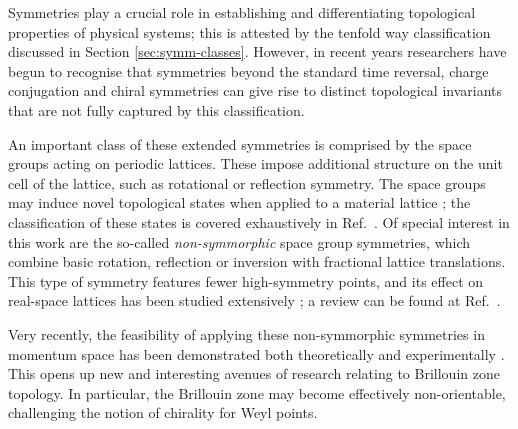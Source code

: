 \label{chap:non-orientable}

Symmetries play a crucial role in establishing and differentiating topological properties of physical systems; this is attested by the tenfold way classification discussed in Section \ref{sec:symm-classes}. However, in recent years researchers have begun to recognise that symmetries beyond the standard time reversal, charge conjugation and chiral symmetries can give rise to distinct topological invariants that are not fully captured by this classification.

An important class of these extended symmetries is comprised by the space groups acting on periodic lattices. These impose additional structure on the unit cell of the lattice, such as rotational or reflection symmetry. The space groups may induce novel topological states when applied to a material lattice \cite{Po_space-groups}; the classification of these states is covered exhaustively in Ref.~\cite{Shiozaki_AHSS}. Of special interest in this work are the so-called \emph{non-symmorphic} space group symmetries, which combine basic rotation, reflection or inversion with fractional lattice translations. This type of symmetry features fewer high-symmetry points, and its effect on real-space lattices has been studied extensively \cite{Wang_hourglass,Chen_nonsymmorphic-semimetal,Kim_glide-semimetal,Shiozaki_nonsymmorphic-topology,Bzdusek_nodal-chain,Wieder_layer-semimetal,Zhao_nonsymmorphic-semimetal,Yang_nonsymmorphic-semimetal,Wang_hourglass-semimetal,Wang_hourglass-Dirac,Wieder_wallpaper-fermions,Xiao_hourglass-Weyl}; a review can be found at Ref.~\cite{Zhang_nonsymmorphic-review}.

Very recently, the feasibility of applying these non-symmorphic symmetries in momentum space has been demonstrated both theoretically and experimentally \cite{CYZ_Klein-gauge,Zhang_nonsymmorphic,TaoYan_acoustic-Klein,Zhu_acoustic-Klein-halfturn,HZY_RP2,WangZhang_acoustic-Klein-2D,Tao_quadrupole,Fonseca-Vaidya_nonorientable,KönigYang_nonorientable-EPs}. This opens up new and interesting avenues of research relating to Brillouin zone topology. In particular, the Brillouin zone may become effectively non-orientable, challenging the notion of chirality for Weyl points.

